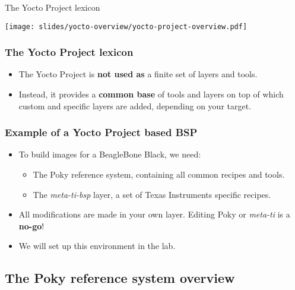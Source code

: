 \begin{frame}{The Yocto Project lexicon}
  \begin{center}
    \texttt{[image: slides/yocto-overview/yocto-project-overview.pdf]}
  \end{center}
\end{frame}

\begin{frame}
  \frametitle{The Yocto Project lexicon}
  \begin{itemize}
    \item The Yocto Project is \textbf{not used as} a finite set of
          layers and tools.
    \item Instead, it provides a \textbf{common base} of tools and
          layers on top of which custom and specific layers are added,
          depending on your target.
  \end{itemize}
\end{frame}

\begin{frame}
  \frametitle{Example of a Yocto Project based BSP}
  \begin{itemize}
    \item To build images for a BeagleBone Black, we need:
    \begin{itemize}
      \item The Poky reference system, containing all common recipes
            and tools.
      \item The {\em meta-ti-bsp} layer, a set of Texas Instruments
            specific recipes.
    \end{itemize}
    \item All modifications are made in your own layer.
      Editing Poky or {\em meta-ti} is a \textbf{no-go}!
    \item We will set up this environment in the lab.
  \end{itemize}
\end{frame}

\subsection{The Poky reference system overview}

